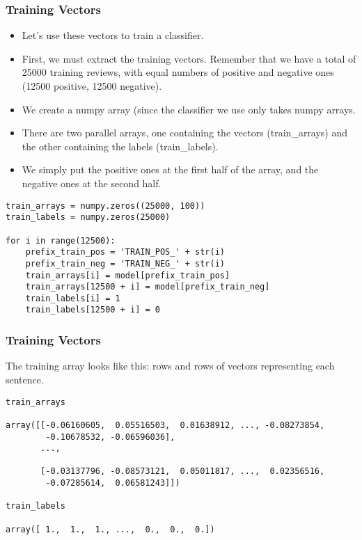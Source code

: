 \begin{frame}[fragile]\frametitle{Training Vectors}
\begin{itemize}
\item  Let's use these vectors to train a classifier.
\item First, we must extract the training vectors. Remember that we have a total of 25000 training reviews, with equal numbers of positive and negative ones (12500 positive, 12500 negative).
\item We create a numpy array (since the classifier we use only takes numpy arrays. 
\item There are two parallel arrays, one containing the vectors (train\_arrays) and the other containing the labels (train\_labels).
\item We simply put the positive ones at the first half of the array, and the negative ones at the second half.
\end{itemize}
\begin{lstlisting}
train_arrays = numpy.zeros((25000, 100))
train_labels = numpy.zeros(25000)

for i in range(12500):
    prefix_train_pos = 'TRAIN_POS_' + str(i)
    prefix_train_neg = 'TRAIN_NEG_' + str(i)
    train_arrays[i] = model[prefix_train_pos]
    train_arrays[12500 + i] = model[prefix_train_neg]
    train_labels[i] = 1
    train_labels[12500 + i] = 0
\end{lstlisting}
\end{frame}


\begin{frame}[fragile]\frametitle{Training Vectors}
The training array looks like this: rows and rows of vectors representing each sentence.
\begin{lstlisting}
train_arrays

array([[-0.06160605,  0.05516503,  0.01638912, ..., -0.08273854,
        -0.10678532, -0.06596036],
       ..., 

       [-0.03137796, -0.08573121,  0.05011817, ...,  0.02356516,
        -0.07285614,  0.06581243]])
		
train_labels

array([ 1.,  1.,  1., ...,  0.,  0.,  0.])
\end{lstlisting}
\end{frame}

